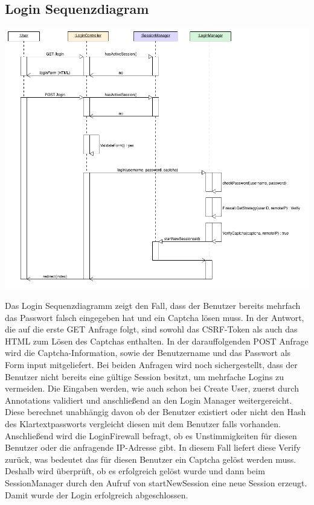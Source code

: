 \documentclass[12pt,DIV14,BCOR10mm,a4paper,twoside,parskip=half-,headsepline,headinclude,english,ngerman,bibliography=totocnumbered]{scrreprt}
\begin{document}
\subsection{Login Sequenzdiagram}
\includegraphics[width=0.70\paperwidth]{resources/loginseq_diagram.png}

Das Login Sequenzdiagramm zeigt den Fall, dass der Benutzer bereits mehrfach das Passwort falsch eingegeben hat und ein Captcha lösen muss. In der Antwort, die auf die erste GET Anfrage folgt, sind sowohl das CSRF-Token als auch das HTML zum Lösen des Captchas enthalten. In der darauffolgenden POST Anfrage wird die Captcha-Information, sowie der Benutzername und das Passwort als Form input mitgeliefert. Bei beiden Anfragen wird noch sichergestellt, dass der Benutzer nicht bereits eine gültige Session besitzt, um mehrfache Logins zu vermeiden. Die Eingaben werden, wie auch schon bei Create User, zuerst durch Annotations validiert und anschließend an den Login Manager weitergereicht. Diese berechnet unabhängig davon ob der Benutzer existiert oder nicht den Hash des Klartextpassworts vergleicht diesen mit dem Benutzer falls vorhanden. Anschließend wird die LoginFirewall befragt, ob es Unstimmigkeiten für diesen Benutzer oder die anfragende IP-Adresse gibt. In diesem Fall liefert diese Verify zurück, was bedeutet das für diesen Benutzer ein Captcha gelöst werden muss. Deshalb wird überprüft, ob es erfolgreich gelöst wurde und dann beim SessionManager durch den Aufruf von startNewSession eine neue Session erzeugt. Damit wurde der Login erfolgreich abgeschlossen.
\end{document}
